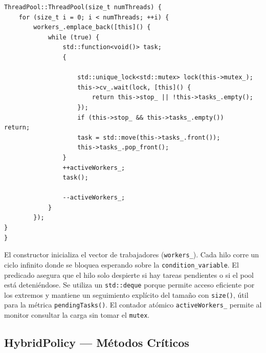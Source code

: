 \documentclass[12pt,letterpaper]{article}
\begin{document}
\begin{tcolorbox}[codebox, title={network/ThreadPool.hpp --- Constructor y Cola de Tareas}]
\begin{lstlisting}
ThreadPool::ThreadPool(size_t numThreads) {
    for (size_t i = 0; i < numThreads; ++i) {
        workers_.emplace_back([this]() {
            while (true) {
                std::function<void()> task;
                {

                    std::unique_lock<std::mutex> lock(this->mutex_);
                    this->cv_.wait(lock, [this]() {
                        return this->stop_ || !this->tasks_.empty();
                    });
                    if (this->stop_ && this->tasks_.empty())
return;
                    task = std::move(this->tasks_.front());
                    this->tasks_.pop_front();
                }
                ++activeWorkers_;
                task();

                --activeWorkers_;
            }
        });
}
}
\end{lstlisting}
\end{tcolorbox}
El constructor inicializa el vector de trabajadores (\texttt{workers\_}). Cada hilo corre un ciclo infinito donde se bloquea esperando sobre la \texttt{condition\_variable}.
El predicado asegura que el hilo solo despierte si hay tareas pendientes o si el pool está deteniéndose.
Se utiliza un \texttt{std::deque} porque permite acceso eficiente por los extremos y mantiene un seguimiento explícito del tamaño con \texttt{size()}, útil para la métrica \texttt{pendingTasks()}.
El contador atómico \texttt{activeWorkers\_} permite al monitor consultar la carga sin tomar el \texttt{mutex}.
\subsection{HybridPolicy --- Métodos Críticos}
\end{document}
